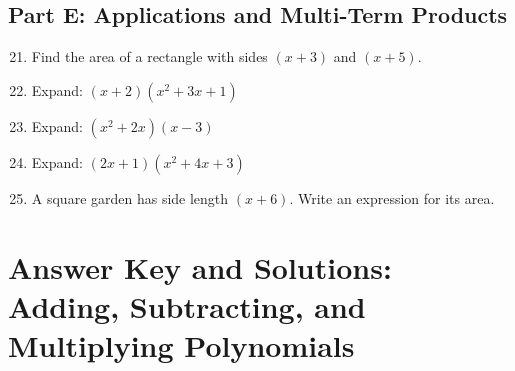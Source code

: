 \documentclass[12pt]{article}
\begin{document}
\subsection*{Part E: Applications and Multi-Term Products}
\begin{enumerate}
  \setcounter{enumi}{20}
  \item Find the area of a rectangle with sides \((x + 3)\) and \((x + 5)\).
  \item Expand: \((x + 2)(x^2 + 3x + 1)\)
  \item Expand: \((x^2 + 2x)(x - 3)\)
  \item Expand: \((2x + 1)(x^2 + 4x + 3)\)
  \item A square garden has side length \((x + 6)\). Write an expression for its area.
\end{enumerate}

\newpage


\section*{Answer Key and Solutions: Adding, Subtracting, and Multiplying Polynomials}
\end{document}
